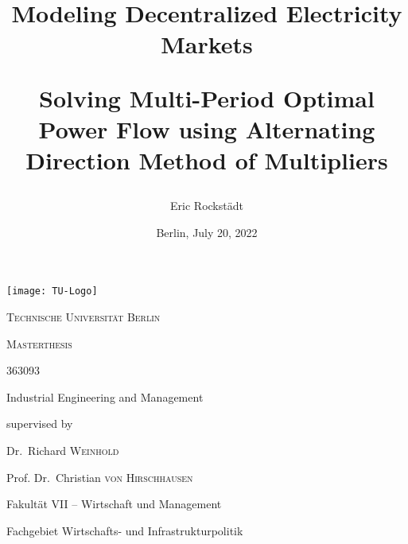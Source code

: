 \documentclass[12pt, a4paper, oneside, bibliography=totoc, numbers=noendperiod]{scrartcl}
\title{\Huge\textbf{Modeling Decentralized Electricity Markets}\par\vspace{0.5cm} \Large Solving Multi-Period Optimal Power Flow using Alternating Direction Method of Multipliers}
\author{Eric Rockstädt}
\date{Berlin, July 20, 2022}
\begin{document}
\begin{titlepage}
	\centering
	\texttt{[image: TU-Logo]}\par\vspace{1cm}
	{\scshape\Large Technische Universität Berlin \par}
	\vspace{1cm}
	{\scshape\Huge Masterthesis\par}
	\vspace{1cm}
	{\@title \par}
	\vspace{1cm}
	{\Large \textit{\@author} \par \large 363093 \par Industrial Engineering and Management \par}
	\vspace{1.5cm}
	\large
	supervised by\par
	Dr.~Richard \textsc{Weinhold}\par
	Prof. Dr.~Christian \textsc{von Hirschhausen} \par
	\vspace{0.5cm}
	Fakultät VII – Wirtschaft und Management \par
	Fachgebiet
Wirtschafts- und Infrastrukturpolitik \par
	\vfill
	{\large \@date\par}
\end{titlepage}

\newpage



\newpage


\newpage


\newpage

\tableofcontents
\newpage

\chead{\textit{\listfigurename}} 
\listoffigures
\newpage

\chead{\textit{\listtablename}} 
\listoftables
\newpage

\chead{\textit{\lstlistlistingname}} 
\lstlistoflistings
\newpage


\printnomenclature
\newpage
\end{document}
